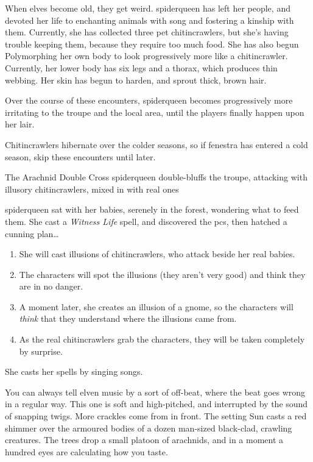 
\noindent
When elves become old, they get weird.
\Gls{spiderqueen} has left her people, and devoted her life to enchanting animals with song and fostering a kinship with them.
Currently, she has collected three pet chitincrawlers, but she's having trouble keeping them, because they require too much food.%
She has also begun Polymorphing her own body to look progressively more like a chitincrawler.
Currently, her lower body has six legs and a thorax, which produces thin webbing.
Her skin has begun to harden, and sprout thick, brown hair.

Over the course of these encounters, \gls{spiderqueen} becomes progressively more irritating to the troupe and the local area, until the players finally happen upon her lair.

Chitincrawlers hibernate over the colder seasons, so if \gls{fenestra} has entered a cold season, skip these encounters until later.%

{The Arachnid Double Cross}%
{\Gls{spiderqueen} double-bluffs the troupe, attacking with illusory chitincrawlers, mixed in with real ones}%
\label{spiderqueenssong}

\Gls{spiderqueen} sat with her babies, serenely in the forest, wondering what to feed them.
She cast a \textit{Witness Life} spell, and discovered the \glspl{pc}, then hatched a cunning plan\ldots


\begin{enumerate}
  \item
  She will cast illusions of chitincrawlers, who attack beside her real babies.
  \item
  The characters will spot the illusions (they aren't very good) and think they are in no danger.
  \item
  A moment later, she creates an illusion of a gnome, so the characters will \emph{think} that they understand where the illusions came from.
  \item
  As the real chitincrawlers grab the characters, they will be taken completely by surprise.
\end{enumerate}

She casts her spells by singing songs.

\begin{boxtext}
  You can always tell elven music by a sort of off-beat, where the beat goes wrong in a regular way.
  This one is soft and high-pitched, and interrupted by the sound of snapping twigs.
  More crackles come from in front.
  The setting Sun casts a red shimmer over the armoured bodies of a dozen man-sized black-clad, crawling creatures.
  The trees drop a small platoon of arachnids, and in a moment a hundred eyes are calculating how you taste.

\end{boxtext}

